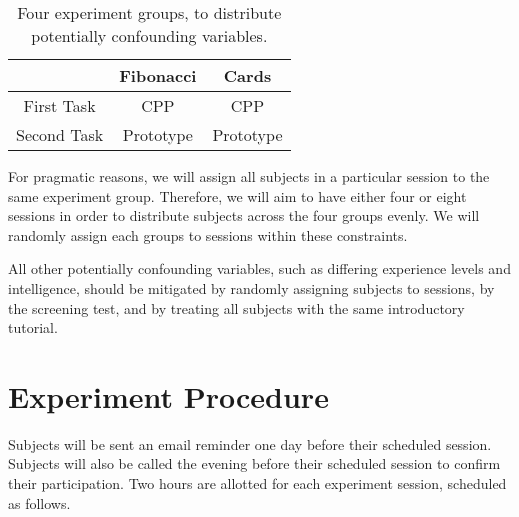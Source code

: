 \documentclass[11pt]{article}
\begin{document}
	\begin{table}[h]
		\centering
		\begin{tabular}{|c|c c|}
			\hline
			& Fibonacci & Cards     \\
			\hline
			First Task  & CPP       & CPP       \\
			Second Task & Prototype & Prototype \\
			\hline
		\end{tabular}
		\caption{Four experiment groups, to distribute potentially confounding variables.}
		\label{tbl:groups}
	\end{table}
	
	For pragmatic reasons, we will assign all subjects in a particular session to
	the same experiment group.  Therefore, we will aim to have either four or eight
	sessions in order to distribute subjects across the four groups evenly.  We
	will randomly assign each groups to sessions within these constraints.
	
	All other potentially confounding variables, such as differing experience
	levels and intelligence, should be mitigated by randomly assigning subjects to
	sessions, by the screening test, and by treating all subjects with the same
	introductory tutorial.
	
	
	\section{Experiment Procedure}
	\label{sec:procedure}
	
	Subjects will be sent an email reminder one day before their scheduled session.
	Subjects will also be called the evening before their scheduled session to
	confirm their participation.
	Two hours are allotted for each experiment session, scheduled as follows.
	
\end{document}
